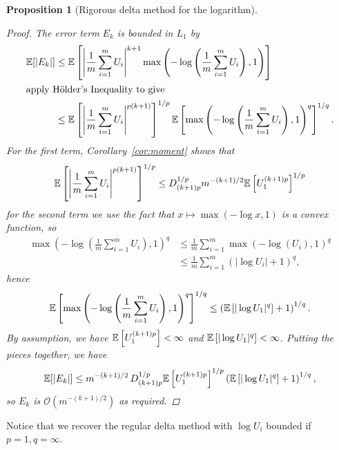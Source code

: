 \documentclass[a4paper, 10pt]{report}
\theoremstyle{plain}
\newtheorem{proposition}[theorem]{Proposition}
\begin{document}
\begin{proposition}[Rigorous delta method for the logarithm]
\begin{proof}
			The error term $E_k$ is bounded in $L_1$ by
			\begin{align}
			\mathbb{E}[|E_k|] &\le \mathbb{E}\left[ \left| \frac{1}{m}\sum_{i=1}^m U_i \right|^{k+1} \max\left(-\log\left( \frac{1}{m}\sum_{i=1}^m U_i \right), 1\right) \right] \\
			\intertext{apply H\"{o}lder's Inequality to give}
			&\le \mathbb{E}\left[ \left| \frac{1}{m}\sum_{i=1}^m U_i \right|^{p(k+1)} \right]^{1/p}\mathbb{E}\left[ \max\left(-\log\left( \frac{1}{m}\sum_{i=1}^m U_i \right), 1\right)^q \right]^{1/q}.
			\end{align}
			For the first term, Corollary~\ref{cor:moment} shows that
			\begin{equation}
			\mathbb{E}\left[ \left| \frac{1}{m}\sum_{i=1}^m U_i \right|^{p(k+1)} \right]^{1/p} \le D_{(k+1)p}^{1/p}m^{-(k+1)/2}\mathbb{E}\left[ U_1^{(k+1)p} \right]^{1/p}
			\end{equation}
			for the second term we use the fact that $x \mapsto \max(-\log x, 1)$ is a convex function, so
			\begin{align}
			\max\left(-\log\left( \frac{1}{m}\sum_{i=1}^m U_i \right), 1\right)^q &\le \frac{1}{m} \sum_{i=1}^m \max\left(-\log\left( U_i \right), 1\right)^q \\
			&\le \frac{1}{m} \sum_{i=1}^m \left(|\log U_i | + 1 \right)^q,
			\end{align}
			hence
			\begin{equation}
			\mathbb{E}\left[ \max\left(-\log\left( \frac{1}{m}\sum_{i=1}^m U_i \right), 1\right)^q \right]^{1/q} \le \left(\mathbb{E}\left[ |\log U_1|^q \right] + 1 \right)^{1/q}.
			\end{equation}
			By assumption, we have $\mathbb{E}\left[U_1^{(k+1)p}\right]<\infty$ and $\mathbb{E}\left[|\log U_1|^q\right]<\infty$. Putting the pieces together, we have
			\begin{equation}
			\mathbb{E}[|E_k|] \le  m^{-(k+1)/2}\, D_{(k+1)p}^{1/p}\mathbb{E}\left[ U_1^{(k+1)p} \right]^{1/p} \left(\mathbb{E}\left[ |\log U_1|^q \right] + 1 \right)^{1/q},
			\end{equation}
			so $E_k$ is $\mathcal{O}\left(m^{-(k+1)/2}\right)$ as required.
		\end{proof}
	\end{proposition}
	Notice that we recover the regular delta method with $\log U_i$ bounded if $p=1,q=\infty$.
	
	
	
	
	
	
	
\end{document}
